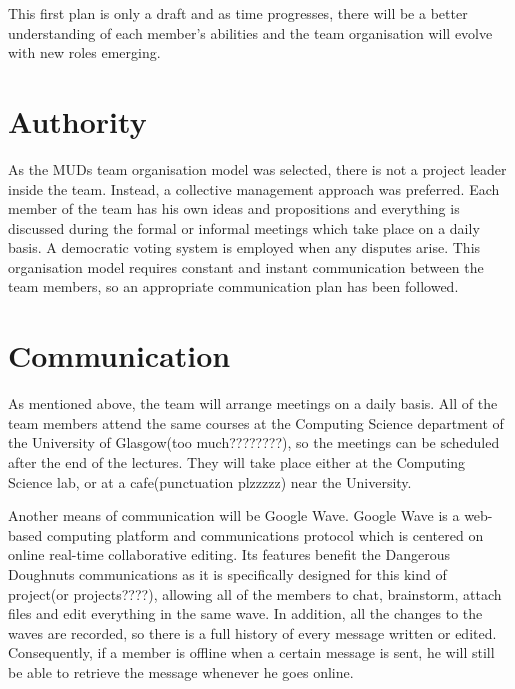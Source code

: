 \documentclass{article}
\begin{document}
This first plan is only a draft and as time progresses, there will be a better understanding of each member's abilities and the team organisation will evolve with new roles emerging. 


\section{Authority}
\label{auth}

As the MUDs team organisation model was selected, there is not a project leader inside the team. Instead, a collective management approach was preferred. Each member of the team has his own ideas and propositions and everything is discussed during the formal or informal meetings which take place on a daily basis. A democratic voting system is employed when any disputes arise. This organisation model requires constant and instant communication between the team members, so an appropriate communication plan has been followed.


\section{Communication}
\label{com}

As mentioned above, the team will arrange meetings on a daily basis. All of the team members attend the same courses at the Computing Science department of the University of Glasgow(too much????????), so the meetings can be scheduled after the end of the lectures. They will take place either at the Computing Science lab, or at a cafe(punctuation plzzzzz) near the University.

Another means of communication will be Google Wave. Google Wave is a web-based computing platform and communications protocol which is centered on online real-time collaborative editing. Its features benefit the Dangerous Doughnuts communications as it is specifically designed for this kind of project(or projects????), allowing all of the members to chat, brainstorm, attach files and edit everything in the same wave. In addition, all the changes to the waves are recorded, so there is a full history of every message written or edited. Consequently, if a member is offline when a certain message is sent, he will still be able to retrieve the message whenever he goes online.
\end{document}
